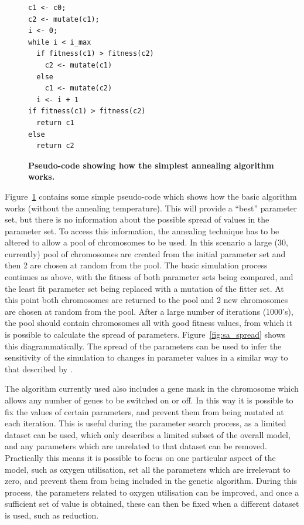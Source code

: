 \begin{figure}
\begin{verbatim}
c1 <- c0;
c2 <- mutate(c1);
i <- 0;
while i < i_max
  if fitness(c1) > fitness(c2)
    c2 <- mutate(c1)
  else
    c1 <- mutate(c2)
  i <- i + 1
if fitness(c1) > fitness(c2)
  return c1
else
  return c2
\end{verbatim}
\caption{{\bf Pseudo-code showing how the simplest annealing algorithm works.}
\label{fig:sa_code}}
\end{figure}

Figure~\ref{fig:sa_code} contains some simple pseudo-code which shows how the basic algorithm works (without the annealing temperature). This will provide a ``best'' parameter set, but there is no information about the possible spread of values in the parameter set. To access this information, the annealing technique has to be altered to allow a pool of chromosomes to be used. In this scenario a large (30, currently) pool of chromosomes are created from the initial parameter set and then 2
are chosen at random from the pool. The basic simulation process continues as above, with the fitness of both parameter sets being compared, and the least fit parameter set being replaced with a mutation of the fitter set. At this point both chromosomes are returned to the pool and 2 new chromosomes are chosen at random from the pool. After a large number of iterations (1000's), the pool should contain chromosomes all with good fitness values, from which it is possible to calculate the spread of parameters. Figure~\ref{fig:sa_spread} shows this diagrammatically. The spread of the parameters can be used to infer the sensitivity of the simulation to changes in parameter values in a similar way to that described by \citet{Toni2009}.

The algorithm currently used also includes a gene mask in the chromosome which allows any number of genes to be switched on or off. In this way it is possible to fix the values of certain parameters, and prevent them from being mutated at each iteration. This is useful during the parameter search process, as a limited dataset can be used, which only describes a limited subset of the overall model, and any parameters which are unrelated to that dataset can be removed. Practically this means it is possible to focus on one particular aspect of the model, such as oxygen utilisation, set all the parameters which are irrelevant to zero, and prevent them from being included in the genetic algorithm. During this process, the parameters related to oxygen utilisation can be improved, and once a sufficient set of value is obtained, these can then be fixed when a different dataset is used, such as \cNO \space reduction.

